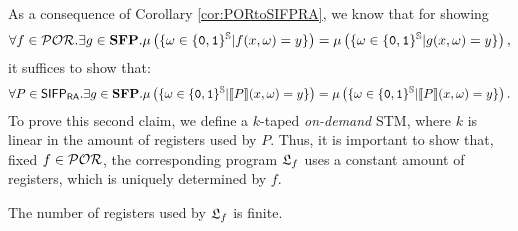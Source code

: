 As a consequence of Corollary \ref{cor:PORtoSIFPRA}, we know that for showing
%
%
$$
\forall f \in \mathcal{POR}.\exists g \in \mathbf{SFP}.
\mu\left(\{\omega \in \{\mathtt{0}, \mathtt{1} \}^{\mathbb{S}} | f(x, \omega)=y\}\right)=\mu\left(\{\omega \in \{\mathtt{0}, \mathtt{1} \}^{\mathbb{S}} | g(x, \omega)=y\}\right),
$$
%
it suffices to show that:
%
$$
\forall P \in \mathsf{SIFP_{{\mathsf{RA}}}}.\exists g \in \mathbf{SFP}.
\mu\left(\{\omega \in \{\mathtt{0}, \mathtt{1} \}^{\mathbb{S}} | \llbracket P\rrbracket(x, \omega)=y\}\right)=\mu\left(\{\omega \in \{\mathtt{0}, \mathtt{1} \}^{\mathbb{S}} | \llbracket P\rrbracket(x, \omega)=y\}\right).
$$
%
To prove this second claim, we define a $k$-taped \emph{on-demand} STM, where
$k$ is linear in the amount of registers used by $P$.
Thus, it is important to show that, fixed $f \in \mathcal{POR}$, the corresponding program
${\mathfrak L_{f}}$ uses a constant amount of registers, which is uniquely determined by $f$.
%

\begin{remark}
The number of registers used by ${\mathfrak L_{f}}$ is finite.
\end{remark}

